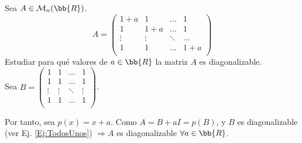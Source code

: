 \begin{ejercicio}
    Sea $A\in \mathcal{M}_n(\bb{R})$.
    $$A=\left( \begin{array}{cccc}
        1+a & 1 & \dots & 1 \\
        1 & 1+a & \dots & 1 \\
        \vdots & \vdots & \ddots & \dots \\
        1 & 1 & \dots & 1+a \\
    \end{array}\right)$$
    Estudiar para qué valores de $a\in \bb{R}$ la matriz $A$ es diagonalizable.\\

    Sea $B=\left( \begin{array}{cccc}
        1 & 1 & \dots & 1 \\
        1 & 1 & \dots & 1 \\
        \vdots & \vdots & \ddots & \vdots \\
        1 & 1 & \dots & 1 \\
    \end{array}\right)$.
    
    Por tanto, sea $p(x)=x+a$. Como $A=B+aI=p(B)$, y $B$ es diagonalizable (ver Ej. \ref{Ej:TodosUnos}) $\Longrightarrow A$ es diagonalizable $\forall a\in \bb{R}$.
\end{ejercicio}

